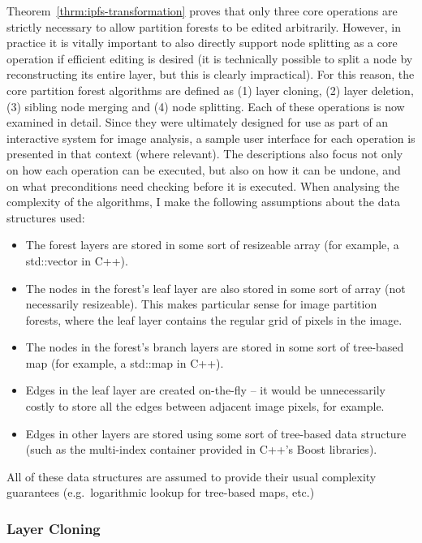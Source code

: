 \noindent Theorem~\ref{thrm:ipfs-transformation} proves that only three core operations are strictly necessary to allow partition forests to be edited arbitrarily. However, in practice it is vitally important to also directly support node splitting as a core operation if efficient editing is desired (it is technically possible to split a node by reconstructing its entire layer, but this is clearly impractical). For this reason, the core partition forest algorithms are defined as (1) layer cloning, (2) layer deletion, (3) sibling node merging and (4) node splitting. Each of these operations is now examined in detail. Since they were ultimately designed for use as part of an interactive system for image analysis, a sample user interface for each operation is presented in that context (where relevant). The descriptions also focus not only on how each operation can be executed, but also on how it can be undone, and on what preconditions need checking before it is executed. When analysing the complexity of the algorithms, I make the following assumptions about the data structures used:

\begin{itemize}
\item The forest layers are stored in some sort of resizeable array (for example, a std::vector in C++).
\item The nodes in the forest's leaf layer are also stored in some sort of array (not necessarily resizeable). This makes particular sense for image partition forests, where the leaf layer contains the regular grid of pixels in the image.
\item The nodes in the forest's branch layers are stored in some sort of tree-based map (for example, a std::map in C++).
\item Edges in the leaf layer are created on-the-fly -- it would be unnecessarily costly to store all the edges between adjacent image pixels, for example.
\item Edges in other layers are stored using some sort of tree-based data structure (such as the multi-index container provided in C++'s Boost libraries).
\end{itemize}

\noindent All of these data structures are assumed to provide their usual complexity guarantees (e.g.~logarithmic lookup for tree-based maps, etc.)

\newpage

\subsubsection{Layer Cloning}

